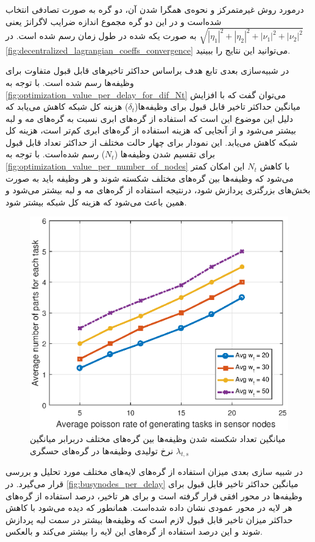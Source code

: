	درمورد روش غیرمتمرکز و نحوه‌ی همگرا شدن آن، دو گره به صورت تصادفی انتخاب شده‌است و در این دو گره مجموع اندازه‌ ضرایب لاگرانژ یعنی $\sqrt{|\eta_1|^2+|\eta_2|^2+|\nu_1|^2+|\nu_2|^2}$ به صورت یکه شده در طول زمان رسم شده است. در \cref{fig:decentralized_lagrangian_coeffs_convergence} می‌توانید این نتایج را ببینید.

	در شبیه‌سازی بعدی تابع هدف براساس حداکثر تاخیرهای قابل قبول متفاوت برای وظیفه‌ها رسم شده است. با توجه به \cref{fig:optimization_value_per_delay_for_dif_Nt} می‌توان گفت که با افزایش میانگین حداکثر تاخیر قابل قبول برای وظیفه‌ها($\delta_t$) هزینه کل شبکه کاهش می‌یابد که دلیل این موضوع این است که استفاده از گره‌های ابری نسبت به گره‌های مه و لبه بیشتر می‌شود و از آنجایی که هزینه استفاده از گره‌های ابری کم‌تر است، هزینه کل شبکه کاهش می‌یابد. این نمودار برای چهار حالت مختلف از حداکثر تعداد قابل قبول برای تقسیم شدن وظیفه‌ها ($N_t$) رسم شده‌است. با توجه به \cref{fig:optimization_value_per_number_of_nodes} با کاهش $N_t$ این امکان کمتر می‌شود که وظیفه‌ها بین گره‌های مختلف شکسته شوند و هر وظیفه باید به صورت بخش‌های بزرگتری پردازش شود، درنتیجه استفاده از گره‌های مه و لبه بیشتر می‌شود و همین باعث می‌شود که هزینه کل شبکه بیشتر شود. 

\begin{figure}[h!]
	\centerline{\includegraphics[width=12cm]{graphics/3-cent-decent/number_of_parts_per_task_generating_rate}}
	\caption{میانگین تعداد شکسته شدن وظیفه‌ها بین گره‌های مختلف دربرابر میانگین نرخ تولیدی وظیفه‌ها در گره‌های حسگری $\lambda_{t,s}$}
	\label{fig:number_of_parts_per_task_generating_rate}
\end{figure}

	در شبیه سازی بعدی میزان استفاده از گره‌های لایه‌های مختلف مورد تحلیل و بررسی قرار می‌گیرد. در \cref{fig:busynodes_per_delay} میانگین حداکثر تاخیر قابل قبول برای وظیفه‌ها در محور افقی قرار گرفته است و برای هر تاخیر، درصد استفاده از گره‌های هر لایه در محور عمودی نشان داده شده‌است. همانطور که دیده می‌شود با کاهش حداکثر میزان تاخیر قابل قبول لازم است که وظیفه‌ها بیشتر در سمت لبه پردازش شوند و این درصد استفاده از گره‌های این لایه را بیشتر می‌کند و بالعکس. 

